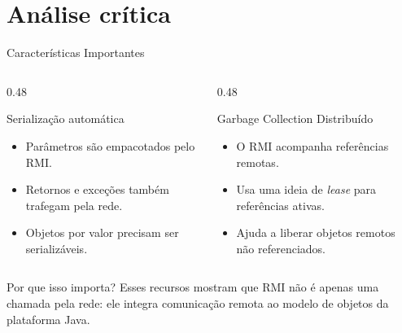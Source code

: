 \documentclass[aspectratio=169]{beamer}
\begin{document}
\section{Análise crítica}

\begin{frame}{Características Importantes}
    \begin{columns}[T]
        \begin{column}{0.48\textwidth}
            \begin{block}{Serialização automática}
                \begin{itemize}
                    \item Parâmetros são empacotados pelo RMI.
                    \item Retornos e exceções também trafegam pela rede.
                    \item Objetos por valor precisam ser serializáveis.
                \end{itemize}
            \end{block}
        \end{column}

        \begin{column}{0.48\textwidth}
            \begin{block}{Garbage Collection Distribuído}
                \begin{itemize}
                    \item O RMI acompanha referências remotas.
                    \item Usa uma ideia de \textit{lease} para referências ativas.
                    \item Ajuda a liberar objetos remotos não referenciados.
                \end{itemize}
            \end{block}
        \end{column}
    \end{columns}

    \vspace{0.3cm}
    \begin{block}{Por que isso importa?}
        Esses recursos mostram que RMI não é apenas uma chamada pela rede: ele integra comunicação remota ao modelo de objetos da plataforma Java.
    \end{block}
\end{frame}
\end{document}
